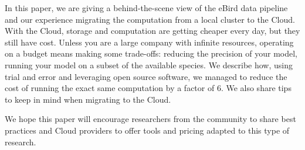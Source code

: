 \documentclass{acm_proc_article-sp}
\begin{document}
In this paper, we are giving a behind-the-scene view of the eBird data pipeline and our experience migrating the computation from a local cluster to the Cloud. With the Cloud, storage and computation are getting cheaper every day, but they still have cost. Unless you are a large company with infinite resources, operating on a budget means making some trade-offs: reducing the precision of your model, running your model on a subset of the available species.
We describe how, using trial and error and leveraging open source software, we managed to reduce the cost of running the exact same computation by a factor of 6. We also share tips to keep in mind when migrating to the Cloud.

We hope this paper will encourage researchers from the community to share best practices and Cloud providers to offer tools and pricing adapted to this type of research.




\vspace{2.5mm}

\end{document}
